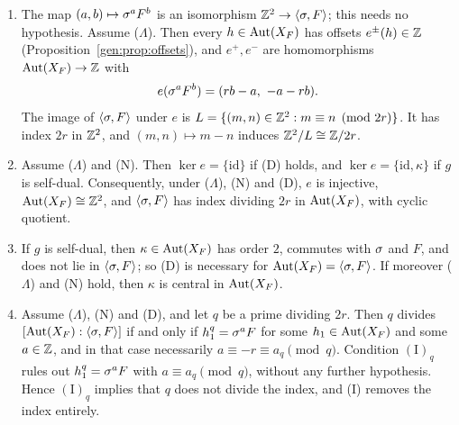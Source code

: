 \begin{theorem}\label{gen:structure}
\begin{enumerate}
\item[(a)] The map $(a,b)\mapsto\sigma^aF^b$ is an isomorphism $\mathbb{Z}^2\to\langle\sigma,F\rangle$; this needs no hypothesis. Assume \textup{($\Lambda$)}. Then every $h\in\operatorname{Aut}(X_F)$ has offsets $e^\pm(h)\in\mathbb{Z}$ (Proposition~\ref{gen:prop:offsets}), and $e^+,e^-$ are homomorphisms $\operatorname{Aut}(X_F)\to\mathbb{Z}$ with
\[
e(\sigma^aF^b)=(rb-a,\ -a-rb).
\]
The image of $\langle\sigma,F\rangle$ under $e$ is $L=\{(m,n)\in\mathbb{Z}^2:m\equiv n\pmod{2r}\}$. It has index $2r$ in $\mathbb{Z}^2$, and $(m,n)\mapsto m-n$ induces $\mathbb{Z}^2/L\cong\mathbb{Z}/2r$.
\item[(b)] Assume \textup{($\Lambda$)} and \textup{(N)}. Then $\ker e=\{\mathrm{id}\}$ if \textup{(D)} holds, and $\ker e=\{\mathrm{id},\kappa\}$ if $g$ is self-dual. Consequently, under \textup{($\Lambda$)}, \textup{(N)} and \textup{(D)}, $e$ is injective, $\operatorname{Aut}(X_F)\cong\mathbb{Z}^2$, and $\langle\sigma,F\rangle$ has index dividing $2r$ in $\operatorname{Aut}(X_F)$, with cyclic quotient.
\item[(c)] If $g$ is self-dual, then $\kappa\in\operatorname{Aut}(X_F)$ has order $2$, commutes with $\sigma$ and $F$, and does not lie in $\langle\sigma,F\rangle$; so \textup{(D)} is necessary for $\operatorname{Aut}(X_F)=\langle\sigma,F\rangle$. If moreover \textup{($\Lambda$)} and \textup{(N)} hold, then $\kappa$ is central in $\operatorname{Aut}(X_F)$.
\item[(d)] Assume \textup{($\Lambda$)}, \textup{(N)} and \textup{(D)}, and let $q$ be a prime dividing $2r$. Then $q$ divides $[\operatorname{Aut}(X_F):\langle\sigma,F\rangle]$ if and only if $h_1^q=\sigma^aF$ for some $h_1\in\operatorname{Aut}(X_F)$ and some $a\in\mathbb{Z}$, and in that case necessarily $a\equiv-r\equiv a_q\pmod q$. Condition $(\mathrm{I})_q$ rules out $h_1^q=\sigma^aF$ with $a\equiv a_q\pmod q$, without any further hypothesis. Hence $(\mathrm{I})_q$ implies that $q$ does not divide the index, and \textup{(I)} removes the index entirely.
\end{enumerate}
\end{theorem}

